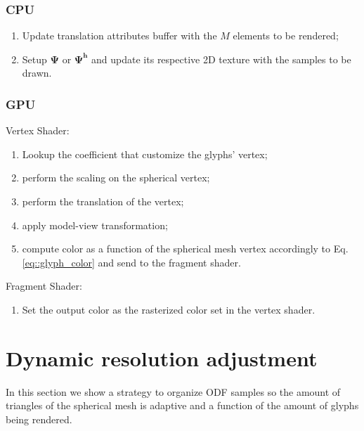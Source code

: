 \documentclass[twoside,twocolumn,10pt]{article}
\begin{document}
\subsubsection{CPU}
\begin{enumerate}
    \item Update translation attributes buffer with the $M$ elements to be rendered;
    \item Setup $\bm{\Psi}$ or $\bm{\Psi^h}$ and update its respective 2D texture with the samples to be drawn.
\end{enumerate}

\subsubsection{GPU}
Vertex Shader:
\begin{enumerate}
    \item Lookup the coefficient that customize the glyphs' vertex; 
    \item perform the scaling on the spherical vertex;
    \item perform the translation of the vertex;
    \item apply model-view transformation;
    \item compute color as a function of the spherical mesh vertex accordingly to Eq. \ref{eq::glyph_color} and send to the fragment shader.
\end{enumerate}

Fragment Shader:
\begin{enumerate}
    \item Set the output color as the rasterized color set in the vertex shader.
\end{enumerate}






\section{Dynamic resolution adjustment}

In this section we show a strategy to organize ODF samples so the amount of triangles of the spherical mesh is adaptive and a function of the amount of glyphs being rendered.
\end{document}
